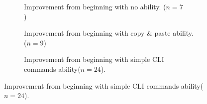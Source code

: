 \documentclass[10pt, twocolumn]{article}
\begin{document}
\begin{figure}[t]
\centering
\begin{subfigure}[c]{2.1in}
    \centering
        \caption{
        Improvement from beginning with no ability. ($n=7$)~~~~~~~~~~~~~~~~~~~~~~~~~~
                \label{shellDetailSkill1}}

    \end{subfigure}
    \begin{subfigure}[c]{2.1in}
        \centering
        \caption{
        Improvement from beginning with copy \& paste ability. ($n=9$)~~~~~~~~~~~~~~~~~~~~~~~~
            \label{shellDetailSkill2}}
    
    \end{subfigure}
    \begin{subfigure}[c]{2.1in}
        \centering
        \caption{
        Improvement from beginning with simple CLI commands ability($n=24$).
        \label{shellDetailSkill3}}
        

\end{subfigure}
\end{figure}
\end{document}
